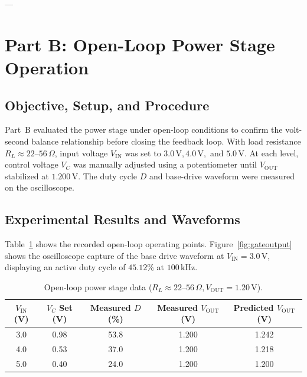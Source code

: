 \documentclass[11pt,a4paper]{article}
\begin{document}
---

\section{Part B: Open-Loop Power Stage Operation}

\subsection{Objective, Setup, and Procedure}
Part~B evaluated the power stage under open-loop conditions to confirm the volt-second balance relationship before closing the feedback loop. With load resistance $R_L \approx 22\text{--}56\,\Omega$, input voltage $V_{\mathrm{IN}}$ was set to $3.0\,\mathrm{V}, 4.0\,\mathrm{V},$ and $5.0\,\mathrm{V}$. At each level, control voltage $V_C$ was manually adjusted using a potentiometer until $V_{\mathrm{OUT}}$ stabilized at $1.200\,\mathrm{V}$. The duty cycle $D$ and base-drive waveform were measured on the oscilloscope.

\subsection{Experimental Results and Waveforms}
Table~\ref{tab:open_loop} shows the recorded open-loop operating points. Figure~\ref{fig:gateoutput} shows the oscilloscope capture of the base drive waveform at $V_{\mathrm{IN}} = 3.0\,\mathrm{V}$, displaying an active duty cycle of $45.12\%$ at $100\,\mathrm{kHz}$.

\begin{table}[H]
\centering
\caption{Open-loop power stage data ($R_L \approx 22\text{--}56\,\Omega, V_{\mathrm{OUT}} = 1.20\,\mathrm{V}$).}
\label{tab:open_loop}
\begin{tabular}{@{}ccccc@{}}
\toprule
\textbf{$V_{\mathrm{IN}}$ (V)} & \textbf{$V_C$ Set (V)} & \textbf{Measured $D$ (\%)} & \textbf{Measured $V_{\mathrm{OUT}}$ (V)} & \textbf{Predicted $V_{\mathrm{OUT}}$ (V)} \\ \midrule
3.0 & 0.98 & 53.8 & 1.200 & 1.242 \\
4.0 & 0.53 & 37.0 & 1.200 & 1.218 \\
5.0 & 0.40 & 24.0 & 1.200 & 1.200 \\
\bottomrule
\end{tabular}
\end{table}
\end{document}

